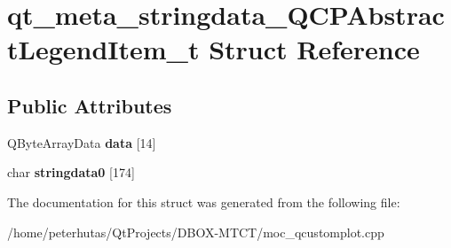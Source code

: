 \hypertarget{structqt__meta__stringdata___q_c_p_abstract_legend_item__t}{}\section{qt\+\_\+meta\+\_\+stringdata\+\_\+\+Q\+C\+P\+Abstract\+Legend\+Item\+\_\+t Struct Reference}
\label{structqt__meta__stringdata___q_c_p_abstract_legend_item__t}
\subsection*{Public Attributes}
\begin{DoxyCompactItemize}
\item 
\mbox{\label{structqt__meta__stringdata___q_c_p_abstract_legend_item__t_afedc8a30b9d66c03673486e9c892c35b}} 
Q\+Byte\+Array\+Data {\bfseries data} \mbox{[}14\mbox{]}
\item 
\mbox{\label{structqt__meta__stringdata___q_c_p_abstract_legend_item__t_a4987f6d279add0af922402e1f2e28b6b}} 
char {\bfseries stringdata0} \mbox{[}174\mbox{]}
\end{DoxyCompactItemize}


The documentation for this struct was generated from the following file\+:\begin{DoxyCompactItemize}
\item 
/home/peterhutas/\+Qt\+Projects/\+D\+B\+O\+X-\/\+M\+T\+C\+T/moc\+\_\+qcustomplot.\+cpp\end{DoxyCompactItemize}
